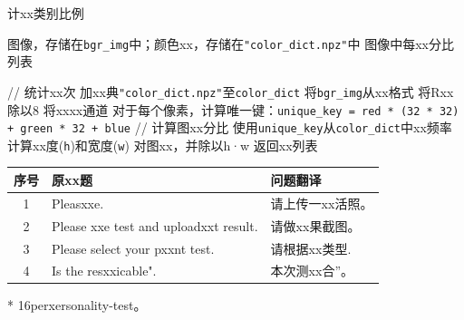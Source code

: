 \begin{algorithm}\small
	\caption{计xx类别比例}\label{alg:name}
	\begin{algorithmic}[1]
		\REQUIRE 图像，存储在\texttt{bgr\_img}中；颜色xx，存储在\texttt{"color\_dict.npz"}中
		\ENSURE 图像中每xx分比列表
		
		\STATE // 统计xx次
		\STATE 加xx典\texttt{"color\_dict.npz"}至\texttt{color\_dict}
		\STATE 将\texttt{bgr\_img}从xx格式
		\STATE 将Rxx除以8
		\STATE 将xxxx通道
		\STATE 对于每个像素，计算唯一键：\texttt{unique\_key = red * (32 * 32) + green * 32 + blue}
		\STATE // 计算图xx分比
		\STATE 使用\texttt{unique\_key}从\texttt{color\_dict}中xx频率
		\STATE 计算xx度(\texttt{h})和宽度(\texttt{w})
		\STATE 对图xx，并除以h·w
		\STATE 返回xx列表
	\end{algorithmic}
\end{algorithm}


\begin{table}[h!]\small%
	\centering
	\begin{threeparttable}[b]
		\label{tbl:dataset survey}
		\begin{tabular}{|c|p{7.4cm}|p{5cm}|} 
			\hline
			\rowcolor{gray!15}
			序号 & 原xx题 & 问题翻译 \\
			\hline
			1 & Pleasxxe. & 请上传一xx活照。 \\  
			\hline
			2 & Please xxe test\tnote{*} and uploadxxt result. & 请做xx果截图。\\
			\hline  
			3 & Please select your pxxnt test. & 请根据xx类型.\\
			\hline
			4 & Is the resxxicable". & 本次测xx合”。\\  
			\hline
		\end{tabular}
		\begin{tablenotes}
			\footnotesize
			\item[*] 16perxersonality-test。
		\end{tablenotes}
	\end{threeparttable}
\end{table}



